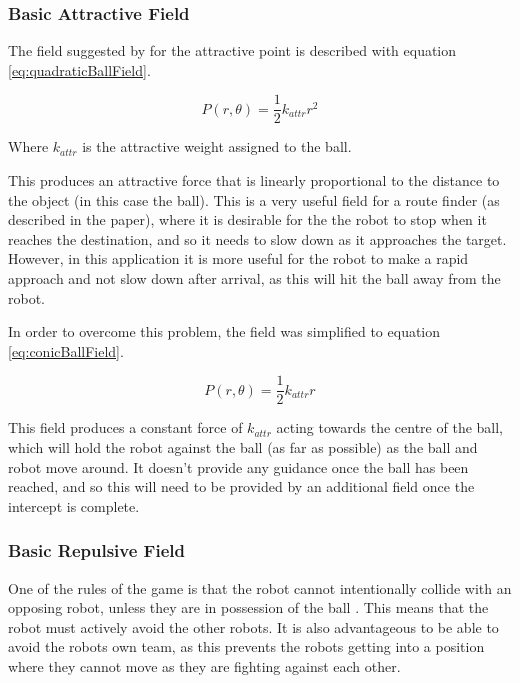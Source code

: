\documentclass[10pt]{article}
\begin{document}
\subsubsection{Basic Attractive Field\label{sub:Basic-Attractive-Field}}

The field suggested by \cite{intelligentAlgorithmPathPlanning} for the attractive point is described with equation \ref{eq:quadraticBallField}.

\begin{equation}
P(r,\theta)=\frac{1}{2}k_{attr}r^{2}\label{eq:quadraticBallField}
\end{equation}

Where $k_{attr}$ is the attractive weight assigned to the ball.

This produces an attractive force that is linearly proportional to the distance to the object (in this case the ball). This is a very useful field for a route finder (as described in the paper), where it is desirable for the the robot to stop when it reaches the destination, and so it needs to slow down as it approaches the target. However, in this application it is more useful for the robot to make a rapid approach and not slow down after arrival, as this will hit the ball away from the robot.

In order to overcome this problem, the field was simplified to equation \ref{eq:conicBallField}.

\begin{equation}
P(r,\theta)=\frac{1}{2}k_{attr}r\label{eq:conicBallField}
\end{equation}

This field produces a constant force of $k_{attr}$ acting towards the centre of the ball, which will hold the robot against the ball (as far as possible) as the ball and robot move around. It doesn't provide any guidance once the ball has been reached, and so this will need to be provided by an additional field once the intercept is complete.

\subsubsection{Basic Repulsive Field\label{sub:Basic-Repulsive-Field}}

One of the rules of the game is that the robot cannot intentionally collide with an opposing robot, unless they are in possession of the ball \cite{simurosotSim}. This means that the robot must actively avoid the other robots. It is also advantageous to be able to avoid the robots own team, as this prevents the robots getting into a position where they cannot move as they are fighting against each other.
\end{document}
